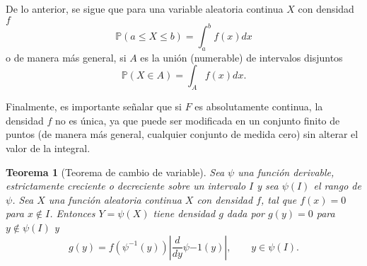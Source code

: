 \documentclass[11pt]{report}
\theoremstyle{break}
\newtheorem{teorema}{Teorema}[chapter]
\theoremstyle{break}
\begin{document}
De lo anterior, se sigue que para una variable aleatoria continua $X$ con densidad $f$
$$
\mathbb{P}(a \leq X \leq b) = \int_{a}^{b}f(x)dx
$$
o de manera más general, si $A$ es la unión (numerable) de intervalos disjuntos
$$
\mathbb{P}(X \in A) = \int_{A}f(x)dx.
$$

Finalmente, es importante señalar que si $F$ es absolutamente continua, la densidad $f$ no es única, ya que puede ser modificada en un conjunto finito de puntos (de manera más general, cualquier conjunto de medida cero) sin alterar el valor de la integral.

\begin{teorema}[Teorema de cambio de variable]
\label{teorema:cambio de variable}
Sea $\psi$ una función derivable, estrictamente creciente o decreciente sobre un intervalo $I$ y sea $\psi(I)$ el rango de $\psi$. Sea $X$ una función aleatoria continua $X$ con densidad $f$, tal que $f(x) = 0$ para $x \notin I$. Entonces $Y = \psi(X)$ tiene densidad $g$ dada por $g(y) = 0$ para $y \notin \psi(I)$ y 
$$
g(y) = f(\psi^{-1}(y)) \left| \dfrac{d}{dy}\psi{-1}(y)\right|, \qquad y \in \psi(I).
$$
\end{teorema}
\end{document}
